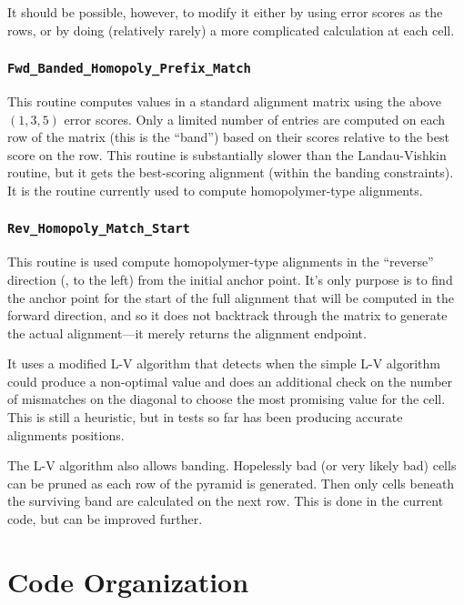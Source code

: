 \documentclass[letterpaper,11pt]{article}
\def\Pgm#1{\texttt{#1}}
\newenvironment{technotes}{\bq\small\bf\bi\exdent{Technical Notes:}}{\ei\eq}
\def\btn{\begin{technotes}}
\def\etn{\end{technotes}}
\begin{document}
It should be possible, however,
to modify it either by using error scores as the rows, or by
doing (relatively rarely) a more complicated calculation at each cell.

\subsubsection{\Pgm{Fwd\_Banded\_Homopoly\_Prefix\_Match}}

This routine computes values in a standard alignment matrix using the above $(1,3,5)$
error scores.  Only a limited number of entries are computed on each row
of the matrix (this is the ``band'') based on their scores relative to the best
score on the row.  This routine is substantially slower than the
Landau-Vishkin routine, but it gets the best-scoring alignment (within
the banding constraints).  It is the routine currently used to
compute homopolymer-type alignments.

\subsubsection{\Pgm{Rev\_Homopoly\_Match\_Start}}

This routine is used compute homopolymer-type alignments in
the ``reverse'' direction (\ie, to the left) from the initial
anchor point.  It's only purpose is to find the anchor point
for the start of the full alignment that will be computed in
the forward direction, and so it does not backtrack through the
matrix to generate the actual alignment---it merely returns
the alignment endpoint.

It uses a modified L-V algorithm
that detects when the simple L-V algorithm could produce a
non-optimal value and does an additional check on the number
of mismatches on the diagonal to choose the most promising value
for the cell.  This is still a heuristic, but in tests so far has
been producing accurate alignments positions.

\btn
\item
  The L-V algorithm also allows banding.  Hopelessly bad (or very
  likely bad) cells can be pruned as each row of the pyramid
  is generated.  Then only cells beneath the surviving band
  are calculated on the next row.  This is done in the current
  code, but can be improved further.
\etn


\section{Code Organization}
\end{document}
